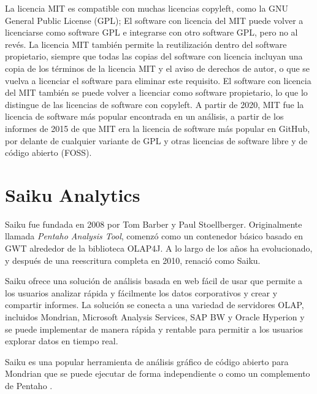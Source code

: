\begin{spacing}{1.5}
	La licencia MIT es compatible con muchas licencias copyleft, como la GNU General Public License (GPL); El software con licencia del MIT puede volver a licenciarse como software GPL e integrarse con otro software GPL, pero no al revés. La licencia MIT también permite la reutilización dentro del software propietario, siempre que todas las copias del software con licencia incluyan una copia de los términos de la licencia MIT y el aviso de derechos de autor, o que se vuelva a licenciar el software para eliminar este requisito. El software con licencia del MIT también se puede volver a licenciar como software propietario, lo que lo distingue de las licencias de software con copyleft. A partir de 2020, MIT fue la licencia de software más popular encontrada en un análisis, a partir de los informes de 2015 de que MIT era la licencia de software más popular en GitHub, por delante de cualquier variante de GPL y otras licencias de software libre y de código abierto (FOSS).
	
\section{Saiku Analytics}
	Saiku fue fundada en 2008 por Tom Barber y Paul Stoellberger. Originalmente llamada \textit{Pentaho Analysis Tool}, comenzó como un contenedor básico basado en GWT alrededor de la biblioteca OLAP4J. A lo largo de los años ha evolucionado, y después de una reescritura completa en 2010, renació como Saiku.
	
	Saiku ofrece una solución de análisis basada en web fácil de usar que permite a los usuarios analizar rápida y fácilmente los datos corporativos y crear y compartir informes. La solución se conecta a una variedad de servidores OLAP, incluidos Mondrian, Microsoft Analysis Services, SAP BW y Oracle Hyperion y se puede implementar de manera rápida y rentable para permitir a los usuarios explorar datos en tiempo real.
	
	Saiku es una popular herramienta de análisis gráfico de código abierto para Mondrian que se puede ejecutar de forma independiente o como un complemento de Pentaho \cite{chap2_mondrian_action}.
	

\end{spacing}
